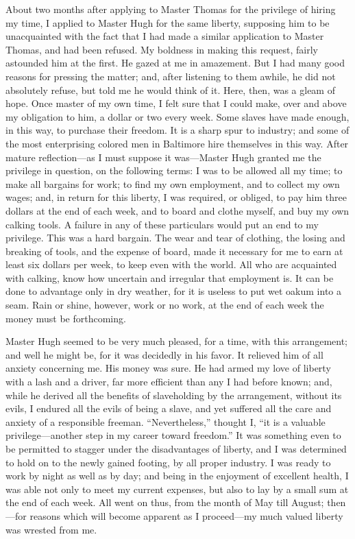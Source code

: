 About two months after applying to Master Thomas for the privilege of
hiring my time, I applied to Master Hugh for the same liberty, supposing
him to be unacquainted with the fact that I had made a
{\protect\hypertarget{328}{}{}}similar application to Master Thomas, and
had been refused. My boldness in making this request, fairly astounded
him at the first. He gazed at me in amazement. But I had many good
reasons for pressing the matter; and, after listening to them awhile, he
did not absolutely refuse, but told me he would think of it. Here, then,
was a gleam of hope. Once master of my own time, I felt sure that I
could make, over and above my obligation to him, a dollar or two every
week. Some slaves have made enough, in this way, to purchase their
freedom. It is a sharp spur to industry; and some of the most
enterprising colored men in Baltimore hire themselves in this way. After
mature reflection---as I must suppose it was---Master Hugh granted me
the privilege in question, on the following terms: I was to be allowed
all my time; to make all bargains for work; to find my own employment,
and to collect my own wages; and, in return for this liberty, I was
required, or obliged, to pay him three dollars at the end of each week,
and to board and clothe myself, and buy my own calking tools. A failure
in any of these particulars would put an end to my privilege. This was a
hard bargain. The wear and tear of clothing, the losing and breaking of
tools, and the expense of board, made it necessary for me to earn at
least six dollars per week, to keep even with the world. All who are
acquainted with calking, know how uncertain and irregular that
employment is. It can be done to advantage only in dry weather, for it
is useless to put wet oakum into a seam. Rain or shine, however, work or
no work, at the end of each week the money must be forthcoming.

{\protect\hypertarget{329}{}{}}Master Hugh seemed to be very much
pleased, for a time, with this arrangement; and well he might be, for it
was decidedly in his favor. It relieved him of all anxiety concerning
me. His money was sure. He had armed my love of liberty with a lash and
a driver, far more efficient than any I had before known; and, while he
derived all the benefits of slaveholding by the arrangement, without its
evils, I endured all the evils of being a slave, and yet suffered all
the care and anxiety of a responsible freeman. ``Nevertheless,'' thought
I, ``it is a valuable privilege---another step in my career toward
freedom.'' It was something even to be permitted to stagger under the
disadvantages of liberty, and I was determined to hold on to the newly
gained footing, by all proper industry. I was ready to work by night as
well as by day; and being in the enjoyment of excellent health, I was
able not only to meet my current expenses, but also to lay by a small
sum at the end of each week. All went on thus, from the month of May
till August; then---for reasons which will become apparent as I
proceed---my much valued liberty was wrested from me.

